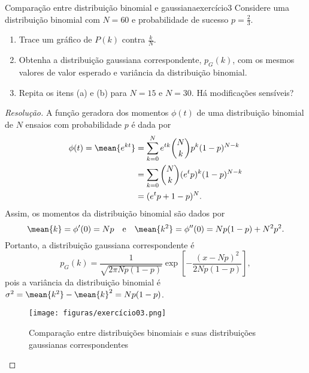\begin{exercício}{Comparação entre distribuição binomial e gaussiana}{exercício3}
    Considere uma distribuição binomial com \(N = 60\) e probabilidade de sucesso \(p = \frac23\).
    \begin{enumerate}[label=(\alph*)]
        \item Trace um gráfico de \(P(k)\) contra \(\frac{k}{N}\).
        \item Obtenha a distribuição gaussiana correspondente, \(p_G(k)\), com os mesmos valores de valor esperado e variância da distribuição binomial.
        \item Repita os itens (a) e (b) para \(N = 15\) e \(N = 30\). Há modificações sensíveis?
    \end{enumerate}
\end{exercício}
\begin{proof}[Resolução]
    A função geradora dos momentos \(\phi(t)\) de uma distribuição binomial de \(N\) ensaios com probabilidade \(p\) é dada por
    \begin{align*}
        \phi(t) = \mean{e^{kt}} &= \sum_{k=0}^N e^{tk}\binom{N}{k} p^{k}(1-p)^{N-k}\\
                                &= \sum_{k=0}  \binom{N}{k} (e^t p)^k (1 - p)^{N -k}\\
                                &= (e^t p + 1 - p)^N.
    \end{align*}
    Assim, os momentos da distribuição binomial são dados por
    \begin{equation*}
        \mean{k} = \phi'(0) = Np
        \quad\text{e}\quad
        \mean{k^2} = \phi''(0) = Np(1 - p) + N^2p^2.
    \end{equation*}
    Portanto, a distribuição gaussiana correspondente é
    \begin{equation*}
        p_G(k) = \frac{1}{\sqrt{2\pi Np(1 - p)}} \exp\left[-\frac{(x - Np)^2}{2Np(1-p)}\right],
    \end{equation*}
    pois a variância da distribuição binomial é \(\sigma^2 = \mean{k^2} - \mean{k}^2 = Np(1 - p)\).
    \begin{figure}[!h]
        \centering
        \texttt{[image: figuras/exercício03.png]}
        \caption{Comparação entre distribuições binomiais e suas distribuições gaussianas correspondentes}
    \end{figure}
\end{proof}
